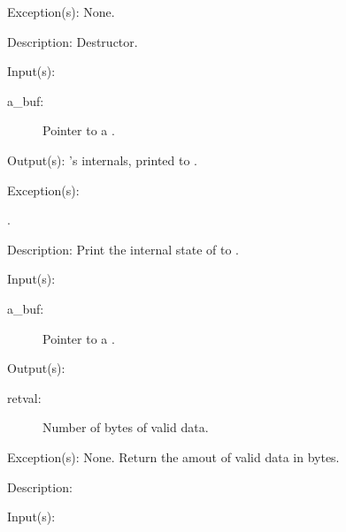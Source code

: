 \begin{capi}
\begin{capilist}
	\item[Exception(s): ] None.
	\item[Description: ]
		Destructor.
	\end{capilist}
\label{buf_dump}
	\begin{capilist}
	\item[Input(s): ]
		\begin{description}\item[]
		\item[a\_buf: ]
			Pointer to a .
		\end{description}
	\item[Output(s): ]
		's internals, printed to .
	\item[Exception(s): ]
		\begin{description}\item[]
		\item[.]
		\end{description}
	\item[Description: ]
		Print the internal state of  to .
	\end{capilist}
\label{buf_size_get}
	\begin{capilist}
	\item[Input(s): ]
		\begin{description}\item[]
		\item[a\_buf: ]
			Pointer to a \classname{buf}.
		\end{description}
	\item[Output(s): ]
		\begin{description}\item[]
		\item[retval: ]
			Number of bytes of valid data.
		\end{description}
	\item[Exception(s): ] None.
		Return the amout of valid data in bytes.
	\item[Description: ]
	\end{capilist}
\label{buf_num_bufels_get}
	\begin{capilist}
	\item[Input(s): ]

\end{capilist}
\end{capi}
